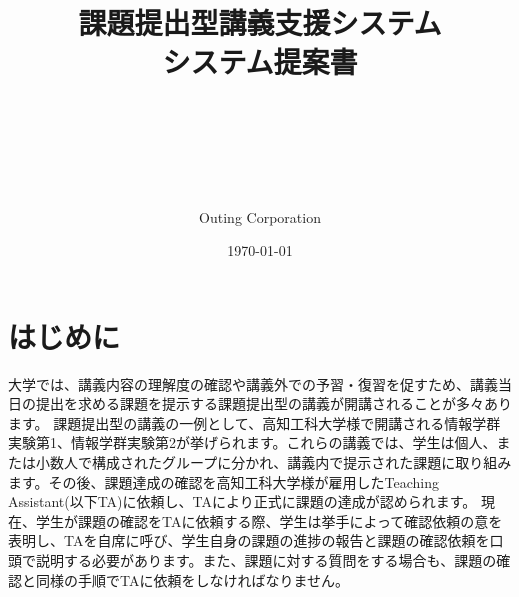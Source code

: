 \documentclass[a4j,titlepage]{ujarticle}
\title{
{課題提出型講義支援システム
\\
システム提案書}
\author{\\
\\
\\
\\
\\
Outing Corporation}
\date{\today}
}
\begin{document}
\maketitle


\tableofcontents

\clearpage

\section{はじめに}



大学では、講義内容の理解度の確認や講義外での予習・復習を促すため、講義当日の提出を求める課題を提示する課題提出型の講義が開講されることが多々あります。
課題提出型の講義の一例として、高知工科大学様で開講される情報学群実験第1、情報学群実験第2が挙げられます。これらの講義では、学生は個人、または小数人で構成されたグループに分かれ、講義内で提示された課題に取り組みます。その後、課題達成の確認を高知工科大学様が雇用したTeaching Assistant(以下TA)に依頼し、TAにより正式に課題の達成が認められます。
現在、学生が課題の確認をTAに依頼する際、学生は挙手によって確認依頼の意を表明し、TAを自席に呼び、学生自身の課題の進捗の報告と課題の確認依頼を口頭で説明する必要があります。また、課題に対する質問をする場合も、課題の確認と同様の手順でTAに依頼をしなければなりません。
\end{document}
